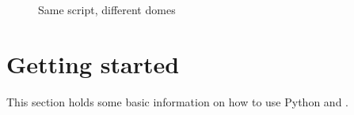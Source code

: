 {\begin{figure}[tbp,h]
\begin{latexonly}
  \end{latexonly}
  \begin{htmlonly}
  \end{htmlonly}
  \caption{Same script, different domes} \label{scallops}
\end{figure}



\section{Getting started}
\label{sec:getting-started}
This section holds some basic information on how to use Python and \pyformex. 

}
